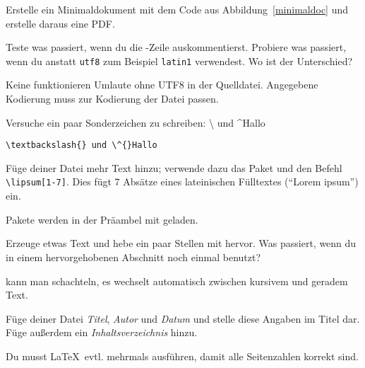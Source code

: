 \begin{uebung}
\item Erstelle ein Minimaldokument mit dem Code aus 
	Abbildung~\ref{minimaldoc} und erstelle daraus eine PDF.\label{firststart:first}


	
\item Teste was passiert, wenn du die -Zeile auskommentierst.
    Probiere was passiert, wenn du anstatt \texttt{utf8} zum Beispiel
    \texttt{latin1} verwendest. Wo ist der Unterschied?\label{inputenc}
    \begin{loesung}
        Keine funktionieren Umlaute ohne UTF8 in der Quelldatei. Angegebene Kodierung muss zur Kodierung der Datei passen.
    \end{loesung}
    
\item Versuche ein paar Sonderzeichen zu schreiben: \textbackslash{} und
    \^{}Hallo\label{specialchars}
    \begin{loesung}
        \verb|\textbackslash{} und \^{}Hallo|
    \end{loesung}

\item Füge deiner Datei mehr Text hinzu; verwende dazu das Paket 
	 und den Befehl \verb+\lipsum[1-7]+. Dies fügt
	7 Absätze eines lateinischen Fülltextes (\enquote{Lorem ipsum}) ein.
	\begin{hinweis}
	    Pakete werden in der Präambel mit  geladen.
	\end{hinweis}\label{firststart:last}

\item Erzeuge etwas Text und hebe ein paar Stellen mit  hervor. Was
	passiert, wenn du in einem hervorgehobenen Abschnitt noch einmal \cmd{emph}
	benutzt?\label{markup:first}
	\begin{loesung}
		 kann man schachteln, es wechselt automatisch zwischen
		kursivem und geradem Text.
	\end{loesung}

\item Füge deiner Datei \emph{Titel}, \emph{Autor} und 
	\emph{Datum} und stelle diese Angaben im Titel dar.
	Füge außerdem ein \emph{Inhaltsverzeichnis} hinzu.
	\begin{hinweis}
	    Du musst \LaTeX\ evtl. mehrmals ausführen, damit alle 
		Seitenzahlen korrekt sind.
	\end{hinweis}


\end{uebung}
